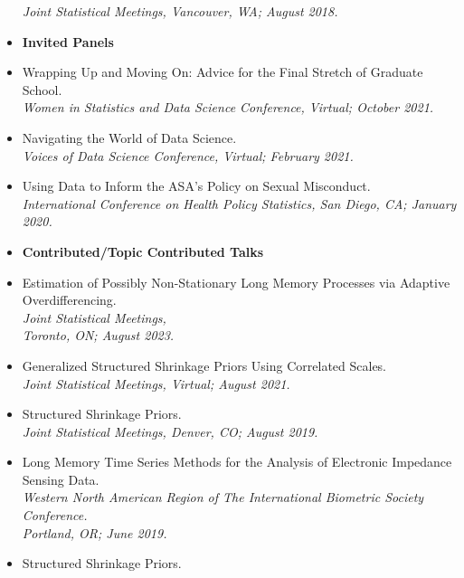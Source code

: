 \documentclass[11pt]{article}
\newcommand{\tab}{\hspace*{2em}}
\begin{document}
\begin{itemize}
	\tab \emph{Joint Statistical Meetings, Vancouver, WA; August 2018.} \vspace{-2mm}
	\item[] \textbf{Invited Panels} \vspace{-2mm}
	\item[] Wrapping Up and Moving On: Advice for the Final Stretch of Graduate School. \\
	\tab \emph{Women in Statistics and Data Science Conference, Virtual; October 2021.} \vspace{-2mm}
	\item[] Navigating the World of Data Science. \\
	\tab \emph{Voices of Data Science Conference, Virtual; February 2021.} \vspace{-2mm}
	\item[] Using Data to Inform the ASA's Policy on Sexual Misconduct. \\
	\tab \emph{International Conference on Health Policy Statistics, San Diego, CA; January 2020.} \vspace{-2mm}
	\item[] \textbf{Contributed/Topic Contributed Talks} \vspace{-2mm}
	\item[] Estimation of Possibly Non-Stationary Long Memory Processes via Adaptive Overdifferencing. \\
	\tab \emph{Joint Statistical Meetings,} \\
	\tab \emph{Toronto, ON; August 2023.} \vspace{-2mm}
	\item[] Generalized Structured Shrinkage Priors Using Correlated Scales. \\
	\tab \emph{Joint Statistical Meetings, Virtual; August 2021.} \vspace{-2mm}
	\item[] Structured Shrinkage Priors. \\
	\tab \emph{Joint Statistical Meetings, Denver, CO; August 2019.} \vspace{-2mm}
	\item[] Long Memory Time Series Methods for the Analysis of Electronic Impedance Sensing Data. \\
	\tab \emph{Western North American Region of The International Biometric Society Conference.} \\
	\tab \emph{Portland, OR; June 2019.} \vspace{-2mm}
	\item[] Structured Shrinkage Priors. \\

\end{itemize}
\end{document}
